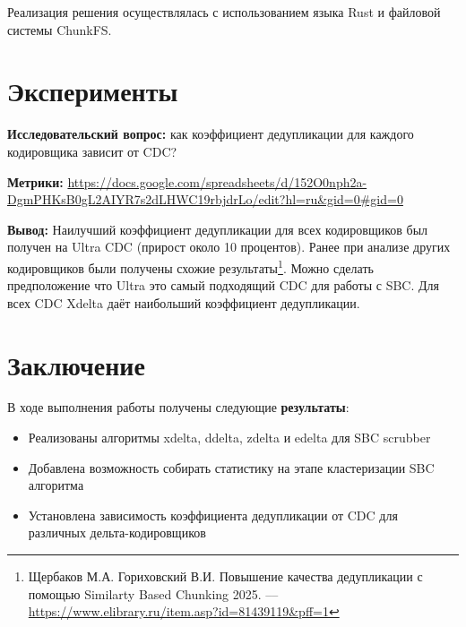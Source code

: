 \documentclass[a4paper]{article}
\begin{document}
Реализация решения осуществлялась с использованием языка Rust и файловой системы ChunkFS.

\section{Эксперименты}



\textbf{Исследовательский вопрос:} как коэффициент дедупликации для каждого кодировщика зависит от CDC?

\textbf{Метрики:} \url{https://docs.google.com/spreadsheets/d/152O0nph2a-DgmPHKsB0gL2AIYR7s2dLHWC19rbjdrLo/edit?hl=ru&gid=0#gid=0}

\textbf{Вывод:} Наилучший коэффициент дедупликации для всех кодировщиков был получен на Ultra CDC (прирост около 10 процентов). Ранее при анализе других кодировщиков были получены схожие результаты\footnote{Щербаков М.А. Гориховский В.И. Повышение качества 
дедупликации с помощью Similarty Based Chunking 2025. –– \url{https://www.elibrary.ru/item.asp?id=81439119&pff=1}}. Можно сделать предположение что Ultra это самый подходящий CDC для работы с SBC. Для всех CDC Xdelta даёт наибольший коэффициент дедупликации.

\section{Заключение}

В ходе выполнения работы получены следующие \textbf{результаты}:


\begin{itemize}
    \item Реализованы алгоритмы xdelta, ddelta, zdelta и
edelta для SBC scrubber
    \item Добавлена возможность собирать статистику
на этапе кластеризации SBC алгоритма
    \item Установлена зависимость коэффициента дедупликации от CDC для различных дельта-кодировщиков
\end{itemize}
\end{document}
